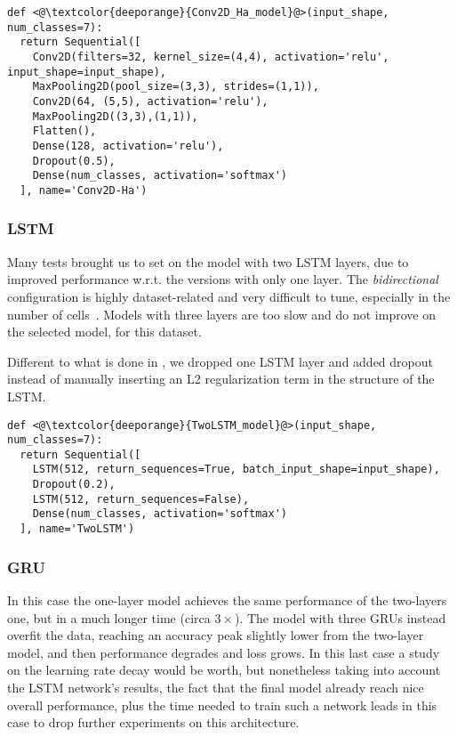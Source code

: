 \begin{minipage}[c]{.9\columnwidth}
\vspace*{.2em}
\begin{lstlisting}
def <@\textcolor{deeporange}{Conv2D_Ha_model}@>(input_shape, num_classes=7):
  return Sequential([
    Conv2D(filters=32, kernel_size=(4,4), activation='relu', input_shape=input_shape),
    MaxPooling2D(pool_size=(3,3), strides=(1,1)),
    Conv2D(64, (5,5), activation='relu'),
    MaxPooling2D((3,3),(1,1)),
    Flatten(),
    Dense(128, activation='relu'),
    Dropout(0.5),
    Dense(num_classes, activation='softmax')
  ], name='Conv2D-Ha')
\end{lstlisting}
\vspace*{.2em}
\end{minipage}

\subsubsection{LSTM}
Many tests brought us to set on the model with two LSTM layers, due to improved performance w.r.t. the versions with only one layer. The \textit{bidirectional} configuration is highly dataset-related and very difficult to tune, especially in the number of cells~\cite{Hammerla-DeepConvRec}.
Models with three layers are too slow and do not improve on the selected model, for this dataset.

Different to what is done in \cite{Pienaar-LSTM}, we dropped one LSTM layer and added dropout instead of manually inserting an L2 regularization term in the structure of the LSTM.

\begin{minipage}[c]{.9\columnwidth}
\vspace*{.5em}
\begin{lstlisting}
def <@\textcolor{deeporange}{TwoLSTM_model}@>(input_shape, num_classes=7):
  return Sequential([
    LSTM(512, return_sequences=True, batch_input_shape=input_shape),
    Dropout(0.2),
    LSTM(512, return_sequences=False),
    Dense(num_classes, activation='softmax')
  ], name='TwoLSTM')
\end{lstlisting}
\vspace*{.2em}
\end{minipage}

\subsubsection{GRU}
In this case the one-layer model achieves the same performance of the two-layers one, but in a much longer time (circa $3\times$).
The model with three GRUs instead overfit the data, reaching an accuracy peak slightly lower from the two-layer model, and then performance degrades and loss grows.
In this last case a study on the learning rate decay would be worth, but nonetheless taking into account the LSTM network's results, the fact that the final model already reach nice overall performance, plus the time needed to train such a network leads in this case to drop further experiments on this architecture.

